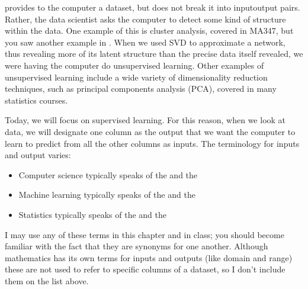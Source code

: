\documentclass[letterpaper,10pt,english]{jupyterBook}
\begin{document}
\sphinxAtStartPar
{} provides to the computer a dataset, but does not break it into input\sphinxhyphen{}output pairs.  Rather, the data scientist asks the computer to detect some kind of structure within the data.  One example of this is cluster analysis, covered in MA347, but you saw another example in {\hyperref[\detokenize{chapter-16-matrices::doc}]{}}.  When we used SVD to approximate a network, thus revealing more of its latent structure than the precise data itself revealed, we were having the computer do unsupervised learning.  Other examples of unsupervised learning include a wide variety of dimensionality reduction techniques, such as principal components analysis (PCA), covered in many statistics courses.

\sphinxAtStartPar
Today, we will focus on supervised learning.  For this reason, when we look at data, we will designate one column as the output that we want the computer to learn to predict from all the other columns as inputs.  The terminology for inputs and output varies:
\begin{itemize}
\item {} 
\sphinxAtStartPar
Computer science typically speaks of the  and the 

\item {} 
\sphinxAtStartPar
Machine learning typically speaks of the  and the 

\item {} 
\sphinxAtStartPar
Statistics typically speaks of the  and the 

\end{itemize}

\sphinxAtStartPar
I may use any of these terms in this chapter and in class; you should become familiar with the fact that they are synonyms for one another.  Although mathematics has its own terms for inputs and outputs (like domain and range) these are not used to refer to specific columns of a dataset, so I don’t include them on the list above.  
\end{document}
